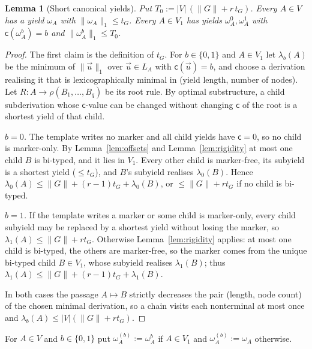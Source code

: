 \documentclass[11pt]{article}
\newtheorem{lemma}[theorem]{Lemma}
\theoremstyle{definition}
\theoremstyle{remark}
\newcommand{\tuple}[1]{\vec{#1}}
\newcommand{\mk}{\mathsf c}
\begin{document}
\begin{lemma}[Short canonical yields]\label{lem:short-canon}
Put $T_0:=|V|\,(\|G\|+r\,t_G)$.  Every $A\in V$ has a yield $\omega_A$ with
$\|\omega_A\|_1\le t_G$.  Every $A\in V_1$ has yields $\omega^0_A,\omega^1_A$
with $\mk(\omega^b_A)=b$ and $\|\omega^b_A\|_1\le T_0$.
\end{lemma}
\begin{proof}
The first claim is the definition of $t_G$.  For $b\in\{0,1\}$ and
$A\in V_1$ let $\lambda_b(A)$ be the minimum of $\|\tuple u\|_1$ over
$\tuple u\in L_A$ with $\mk(\tuple u)=b$, and choose a derivation realising
it that is lexicographically minimal in (yield length, number of nodes).
Let $R:A\to\rho(B_1,\ldots,B_q)$ be its root rule.  By optimal
substructure, a child subderivation whose $\mk$-value can be changed without
changing $\mk$ of the root is a shortest yield of that child.

\emph{$b=0$.}  The template writes no marker and all child yields have
$\mk=0$, so no child is marker-only.  By Lemma~\ref{lem:offsets} and
Lemma~\ref{lem:rigidity} at most one child $B$ is bi-typed, and it lies in
$V_1$.  Every other child is marker-free, its subyield is a shortest yield
($\le t_G$), and $B$'s subyield realises $\lambda_0(B)$.  Hence
$\lambda_0(A)\le\|G\|+(r-1)t_G+\lambda_0(B)$, or $\le\|G\|+rt_G$ if no child
is bi-typed.

\emph{$b=1$.}  If the template writes a marker or some child is
marker-only, every child subyield may be replaced by a shortest yield
without losing the marker, so $\lambda_1(A)\le\|G\|+rt_G$.  Otherwise
Lemma~\ref{lem:rigidity} applies: at most one child is bi-typed, the others
are marker-free, so the marker comes from the unique bi-typed child
$B\in V_1$, whose subyield realises $\lambda_1(B)$; thus
$\lambda_1(A)\le\|G\|+(r-1)t_G+\lambda_1(B)$.

In both cases the passage $A\mapsto B$ strictly decreases the pair
(length, node count) of the chosen minimal derivation, so a chain visits
each nonterminal at most once and $\lambda_b(A)\le|V|(\|G\|+rt_G)$.
\end{proof}

For $A\in V$ and $b\in\{0,1\}$ put $\omega^{(b)}_A:=\omega^b_A$ if
$A\in V_1$ and $\omega^{(b)}_A:=\omega_A$ otherwise.
\end{document}
